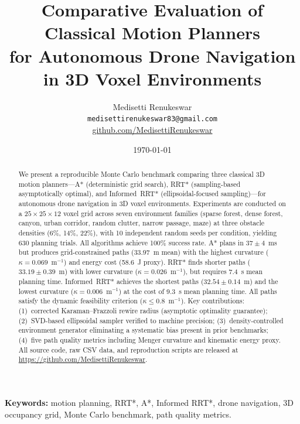 \documentclass[10pt,twocolumn]{article}
\begin{document}
\title{\textbf{Comparative Evaluation of Classical Motion Planners\\
for Autonomous Drone Navigation in 3D Voxel Environments}}

\author{
  Medisetti Renukeswar\\
  \texttt{medisettirenukeswar83@gmail.com}\\
  \href{https://github.com/MedisettiRenukeswar}{github.com/MedisettiRenukeswar}
}

\date{\today}
\maketitle

\begin{abstract}
We present a reproducible Monte Carlo benchmark comparing three classical
3D motion planners---A* (deterministic grid search), RRT* (sampling-based
asymptotically optimal), and Informed~RRT* (ellipsoidal-focused
sampling)---for autonomous drone navigation in 3D voxel environments.
Experiments are conducted on a $25\times25\times12$ voxel grid across
seven environment families (sparse forest, dense forest, canyon, urban
corridor, random clutter, narrow passage, maze) at three obstacle
densities (6\%, 14\%, 22\%), with 10 independent random seeds per
condition, yielding 630 planning trials.
All algorithms achieve 100\% success rate.
A* plans in $37\pm4$~ms but produces grid-constrained paths
($33.97$~m mean) with the highest curvature ($\kappa=0.069$~m$^{-1}$)
and energy cost (58.6~J proxy).
RRT* finds shorter paths ($33.19\pm0.39$~m) with lower curvature
($\kappa=0.026$~m$^{-1}$), but requires 7.4~s mean planning time.
Informed~RRT* achieves the shortest paths ($32.54\pm0.14$~m) and
the lowest curvature ($\kappa=0.006$~m$^{-1}$) at the cost of
9.3~s mean planning time.
All paths satisfy the dynamic feasibility criterion
($\kappa\leq0.8$~m$^{-1}$).
Key contributions: (1)~corrected Karaman--Frazzoli rewire radius
(asymptotic optimality guarantee); (2)~SVD-based ellipsoidal sampler
verified to machine precision; (3)~density-controlled environment
generator eliminating a systematic bias present in prior benchmarks;
(4)~five path quality metrics including Menger curvature and kinematic
energy proxy.
All source code, raw CSV data, and reproduction scripts are released
at \url{https://github.com/MedisettiRenukeswar}.
\end{abstract}

\textbf{Keywords:} motion planning, RRT*, A*, Informed RRT*, drone
navigation, 3D occupancy grid, Monte Carlo benchmark, path quality metrics.
\end{document}
